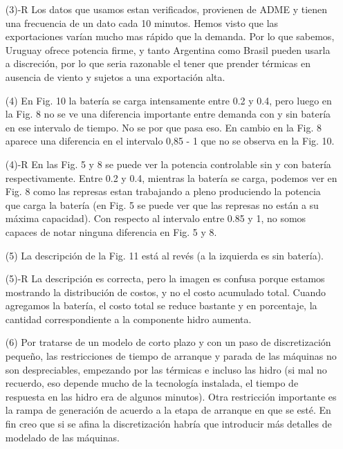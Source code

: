 \documentclass[12pt]{article}
\theoremstyle{definition}
\theoremstyle{remark}
\begin{document}
\begin{enumerate}
\item[(3)-R] Los datos que usamos estan verificados, provienen de ADME y tienen una frecuencia de un dato cada 10 minutos. Hemos visto que las exportaciones var\'ian mucho mas r\'apido que la demanda. Por lo que sabemos, Uruguay ofrece potencia firme, y tanto Argentina como Brasil pueden usarla a discreci\'on, por lo que seria razonable el tener que prender t\'ermicas en ausencia de viento y sujetos a una exportaci\'on alta.

\item[(4)] En Fig. 10 la bater\'ia se carga intensamente entre 0.2 y 0.4, pero luego en la Fig. 8 no se ve una diferencia importante entre demanda con y sin bater\'ia en ese intervalo de tiempo. No se por que pasa eso. En cambio en la Fig. 8 aparece una diferencia en el intervalo 0,85 - 1 que no se observa en la Fig. 10.

\item[(4)-R] En las Fig. 5 y 8 se puede ver la potencia controlable sin y con bater\'ia respectivamente. Entre 0.2 y 0.4, mientras la bater\'ia se carga, podemos ver en Fig. 8 como las represas estan trabajando a pleno produciendo la potencia que carga la bater\'ia (en Fig. 5 se puede ver que las represas no est\'an a su m\'axima capacidad). Con respecto al intervalo entre 0.85 y 1, no somos capaces de notar ninguna diferencia en Fig. 5 y 8.

\item[(5)] La descripci\'on de la Fig. 11 est\'a al rev\'es (a la izquierda es sin bater\'ia).

\item[(5)-R]  La descripci\'on es correcta, pero la imagen es confusa porque estamos mostrando la distribuci\'on de costos, y no el costo acumulado total. Cuando agregamos la bater\'ia, el costo total se reduce bastante y en porcentaje, la cantidad correspondiente a la componente hidro aumenta.

\item[(6)] Por tratarse de un modelo de corto plazo y con un paso de discretizaci\'on pequeño, las restricciones de tiempo de arranque y parada de las máquinas no son despreciables, empezando por las t\'ermicas e incluso las hidro (si mal no recuerdo, eso depende mucho de la tecnolog\'ia instalada, el tiempo de respuesta en las hidro era de algunos minutos). Otra restricci\'on importante es la rampa de generaci\'on de acuerdo a la etapa de arranque en que se est\'e. En fin creo que si se afina la discretizaci\'on habr\'ia que introducir más detalles de modelado de las máquinas.


\end{enumerate}
\end{document}
